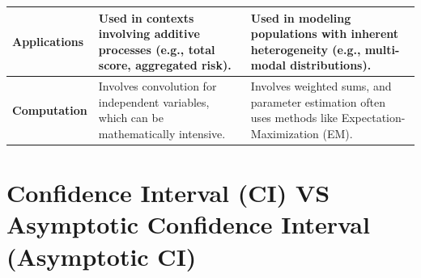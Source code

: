 \begin{customTableWrapper}{1}
\begin{longtable}{|p{2.5cm}|p{5cm}|p{5cm}|}
    \textbf{Applications} & 
    Used in contexts involving additive processes (e.g., total score, aggregated risk). & 
    Used in modeling populations with inherent heterogeneity (e.g., multi-modal distributions). \\
    \hline
    
    \textbf{Computation} & 
    Involves convolution for independent variables, which can be mathematically intensive. & 
    Involves weighted sums, and parameter estimation often uses methods like Expectation-Maximization (EM). \\
    \hline

\end{longtable}
\end{customTableWrapper}




\section{Confidence Interval (CI) VS Asymptotic Confidence Interval (Asymptotic CI) \cite{chatgpt}} \label{Confidence Interval (CI) VS Asymptotic Confidence Interval (Asymptotic CI)}

